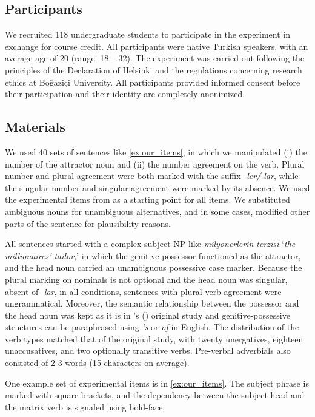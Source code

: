 \documentclass[apacite,linguex]{glossa}\usepackage[]{graphicx}\usepackage[]{color}
\begin{document}
\subsection{Participants} 

We recruited 118 undergraduate students to participate in the experiment in exchange for course credit. All participants were native Turkish speakers, with an average age of 20 (range: 18 -- 32). The experiment was carried out following the principles of the Declaration of Helsinki and the regulations concerning research ethics at Bo\u{g}azi\c{c}i University. All participants provided informed consent before their participation and their identity are completely anonimized.

\subsection{Materials}

We used 40 sets of sentences like \ref{ex:our_items}, in which we manipulated (i) the number of the attractor noun and (ii) the number agreement on the verb. Plural number and plural agreement were both marked with the suffix \textit{-ler/-lar}, while the singular number and singular agreement were marked by its absence. We used the experimental items from \citet{LagoEtAl:2019} as a starting point for all items. We substituted ambiguous nouns for unambiguous alternatives, and in some cases, modified other parts of the sentence for plausibility reasons.

All sentences started with a complex subject NP like \textit{milyonerlerin terzisi} `\textit{the millionaires' tailor},' in which the genitive possessor functioned as the attractor, and the head noun carried an unambiguous possessive case marker. Because the plural marking on nominals is not optional and the head noun was singular, absent of \textit{-lar}, in all conditions, sentences with plural verb agreement were ungrammatical. Moreover, the semantic relationship between the possessor and the head noun was kept as it is in \citeauthor{LagoEtAl:2019}'s (\citeyear{LagoEtAl:2019}) original study and genitive-possessive structures can be paraphrased using \textit{'s} or \textit{of} in English. The distribution of the verb types matched that of the original study, with twenty unergatives, eighteen unaccusatives, and two optionally transitive verbs. Pre-verbal adverbials also consisted of 2-3 words (15 characters on average).

One example set of experimental items is in \ref{ex:our_items}. The subject phrase is marked with square brackets, and the dependency between the subject head and the matrix verb is signaled using bold-face.
\end{document}
